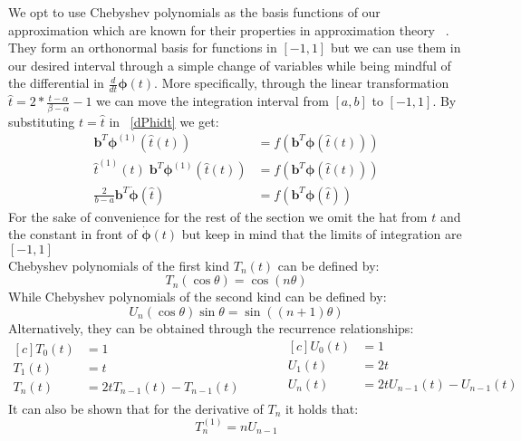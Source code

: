 \documentclass[11pt]{report}
\begin{document}
    We opt to use Chebyshev polynomials as the basis functions of our approximation which are known for their
    properties in approximation theory ~\cite{trefethen1996finite}.
    They form an orthonormal basis for functions in $[-1,1]$ but we can use them in our desired interval through a
    simple change of variables while being mindful of the differential in $\frac{d}{dt} \pmb{\phi}(t) $.
    More specifically, through the linear transformation $\hat{t} = 2*\frac{ t -  \alpha} { \beta - \alpha} -1$ we can
    move the integration interval from $[a,b]$ to $[-1,1]$.
    By substituting $t = \hat{t}$  in ~\eqref{dPhidt} we get:
    \begin{align*}
        \pmb{b}^T \pmb{\phi}^{(1)}(\hat{t}(t)) &= f( \pmb{b}^T \pmb{\phi}(\hat{t}(t)) ) \\
        \hat{t}^{(1)}(t)  \;  \pmb{b}^T \pmb{\phi}^{(1)}(\hat{t}(t))  &= f( \pmb{b}^T \pmb{\phi}(\hat{t}(t)) ) \\
        \frac{2}{b-a} \pmb{b}^T \pmb{\dot\phi}(\hat{t}) &= f( \pmb{b}^T \pmb{\phi}(\hat{t}) )
    \end{align*}
    For the sake of convenience for the rest of the section we omit the hat from $t$ and the constant in front of
    $\pmb{\dot\phi}(t)$ but keep in mind that the limits of integration are $[-1,1]$
    \\

    Chebyshev polynomials of the first kind $T_n(t)$ can be defined by:
    \begin{equation}
        T_n(\cos \theta) = \cos(n \theta)
    \end{equation}
    While Chebyshev polynomials of the second kind can be defined by:
    \begin{equation}
        U_n(\cos \theta) \sin \theta = \sin( (n+1)\theta )
    \end{equation}
    Alternatively, they can be obtained through the recurrence relationships:
    \begin{equation}
        \label{eq:cheb_rec}
        \begin{aligned}[c]
            T_0(t) &= 1 \\
            T_1(t) &= t \\
            T_n(t) &= 2tT_{n-1}(t) - T_{n-1}(t)
        \end{aligned}
        \qquad \quad
        \begin{aligned}[c]
            U_0(t) &= 1 \\
            U_1(t) &= 2t\\
            U_n(t) &= 2tU_{n-1}(t) - U_{n-1}(t)\\
        \end{aligned}
    \end{equation}
    It can also be shown that for the derivative of $T_n$ it holds that:
    \begin{equation}
        T_n^{(1)} = n U_{n-1}
        \label{Dcheb}
    \end{equation}
\end{document}
